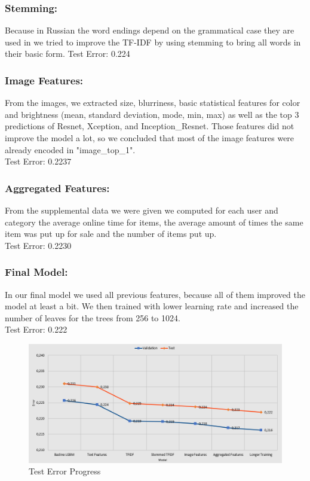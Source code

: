 \documentclass[runningheads]{llncs}
\begin{document}
\subsubsection{Stemming:} Because in Russian the word endings depend on the grammatical case they are used in we tried to improve the TF-IDF by using stemming to bring all words in their basic form.
Test Error: 0.224
\subsubsection{Image Features:} From the images, we extracted size, blurriness, basic statistical features for color and brightness (mean, standard deviation, mode, min, max) as well as the top 3 predictions of Resnet, Xception, and Inception\_Resnet. Those features did not improve the model a lot, so we concluded that most of the image features were already encoded in "image\_top\_1".\\
Test Error: 0.2237 
\subsubsection{Aggregated Features:} From the supplemental data we were given we computed for each user and category the average online time for items, the average amount of times the same item was put up for sale and the number of items put up.\\
Test Error: 0.2230
\subsubsection{Final Model:} In our final model we used all previous features, because all of them improved the model at least a bit. We then trained with lower learning rate and increased the number of leaves for the trees from 256 to 1024.\\
Test Error: 0.222

\begin{figure}[H]
	\centering
	\includegraphics[scale=0.6]{progress}
	\caption[]{Test Error Progress}
	\label{fig:progress}
\end{figure}
\end{document}
